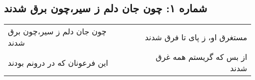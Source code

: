 \begin{center}
\section*{شماره ۱: چون جان دلم ز سیر،‌چون برق شدند}
\label{sec:001}
\begin{longtable}{l p{0.5cm} r}
چون جان دلم ز سیر،‌چون برق شدند
&&
مستغرق او، ز پای تا فرق شدند
\\
این فرعونان که در درونم بودند
&&
از بس که گریستم همه غرق شدند
\\
\end{longtable}
\end{center}
